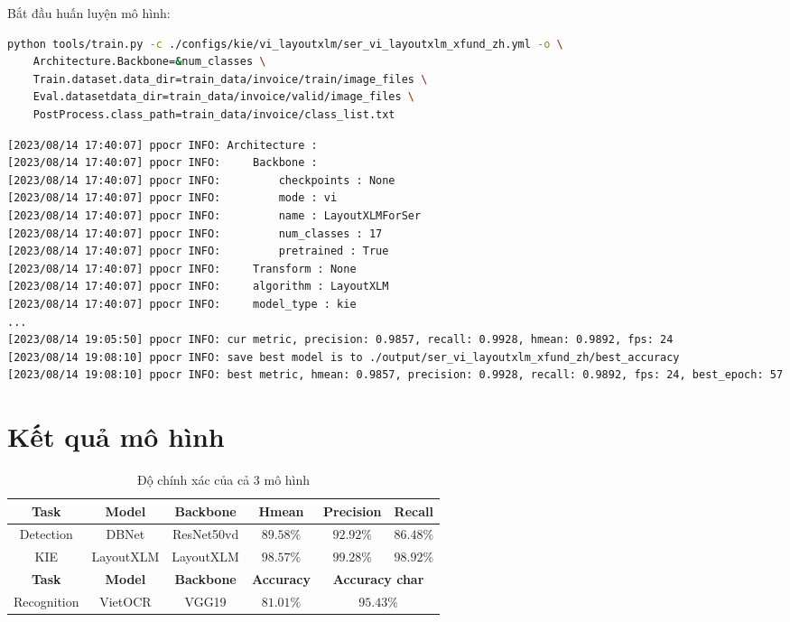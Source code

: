 Bắt đầu huấn luyện mô hình:
\begin{lstlisting}[language=bash]
python tools/train.py -c ./configs/kie/vi_layoutxlm/ser_vi_layoutxlm_xfund_zh.yml -o \
    Architecture.Backbone=&num_classes \
    Train.dataset.data_dir=train_data/invoice/train/image_files \
    Eval.datasetdata_dir=train_data/invoice/valid/image_files \
    PostProcess.class_path=train_data/invoice/class_list.txt
\end{lstlisting}

\begin{lstlisting}[language=bash]
[2023/08/14 17:40:07] ppocr INFO: Architecture : 
[2023/08/14 17:40:07] ppocr INFO:     Backbone : 
[2023/08/14 17:40:07] ppocr INFO:         checkpoints : None
[2023/08/14 17:40:07] ppocr INFO:         mode : vi
[2023/08/14 17:40:07] ppocr INFO:         name : LayoutXLMForSer
[2023/08/14 17:40:07] ppocr INFO:         num_classes : 17
[2023/08/14 17:40:07] ppocr INFO:         pretrained : True
[2023/08/14 17:40:07] ppocr INFO:     Transform : None
[2023/08/14 17:40:07] ppocr INFO:     algorithm : LayoutXLM
[2023/08/14 17:40:07] ppocr INFO:     model_type : kie
...
[2023/08/14 19:05:50] ppocr INFO: cur metric, precision: 0.9857, recall: 0.9928, hmean: 0.9892, fps: 24
[2023/08/14 19:08:10] ppocr INFO: save best model is to ./output/ser_vi_layoutxlm_xfund_zh/best_accuracy
[2023/08/14 19:08:10] ppocr INFO: best metric, hmean: 0.9857, precision: 0.9928, recall: 0.9892, fps: 24, best_epoch: 57
\end{lstlisting}

\section{Kết quả mô hình}
\begin{table}[h]
    \centering
    \begin{tabular}{ | c | c | c | c | c | c | } 
        \hline
        \textbf{Task} & \textbf{Model} & \textbf{Backbone} & \textbf{Hmean} & \textbf{Precision} & \textbf{Recall} \\ 
        \hline
        Detection & DBNet & ResNet50vd & $89.58\%$ & $92.92\%$ & $86.48\%$ \\ 
        \hline
        KIE & LayoutXLM & LayoutXLM & $98.57\%$ & $99.28\%$ & $98.92\%$ \\ 
        \hline
        \hline
        \textbf{Task} & \textbf{Model} & \textbf{Backbone} & \textbf{Accuracy} & \multicolumn{2}{c|}{\textbf{Accuracy char}}   \\ 
        \hline
        Recognition & VietOCR & VGG19 & $81.01\%$ & \multicolumn{2}{c|}{$95.43\%$} \\ 
        \hline
    \end{tabular}
    \caption{Độ chính xác của cả 3 mô hình}
    \label{table:1}
\end{table}

